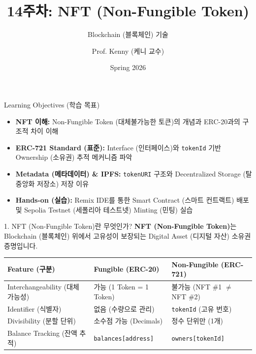 \documentclass[aspectratio=169]{beamer}
\title[14주차: NFT (ERC-721)]{14주차: NFT (Non-Fungible Token)}
\subtitle{Blockchain (블록체인) 기술}
\author[Prof. Kenny]{Prof. Kenny (케니 교수)}
\institute[KNU]{Kyungpook National University (경북대학교)}
\date{Spring 2026}
\begin{document}
\begin{frame}
    \titlepage
\end{frame}

\begin{frame}{Learning Objectives (학습 목표)}
    \begin{itemize}
        \item \textbf{NFT 이해:} Non-Fungible Token (대체불가능한 토큰)의 개념과 ERC-20과의 구조적 차이 이해
        \item \textbf{ERC-721 Standard (표준):} Interface (인터페이스)와 \texttt{tokenId} 기반 Ownership (소유권) 추적 메커니즘 파악
        \item \textbf{Metadata (메타데이터) \& IPFS:} \texttt{tokenURI} 구조와 Decentralized Storage (탈중앙화 저장소) 저장 이유
        \item \textbf{Hands-on (실습):} Remix IDE를 통한 Smart Contract (스마트 컨트랙트) 배포 및 Sepolia Testnet (세폴리아 테스트넷) Minting (민팅) 실습
    \end{itemize}
\end{frame}

\begin{frame}{1. NFT (Non-Fungible Token)란 무엇인가?}
    \textbf{NFT (Non-Fungible Token)}는 Blockchain (블록체인) 위에서 고유성이 보장되는 Digital Asset (디지털 자산) 소유권 증명입니다.

    \vspace{0.5cm}
    \begin{table}[]
        \centering
        \begin{tabular}{@{}lll@{}}
            \toprule
            \textbf{Feature (구분)} & \textbf{Fungible (ERC-20)} & \textbf{Non-Fungible (ERC-721)} \\ \midrule
            Interchangeability (대체 가능성) & 가능 (1 Token = 1 Token) & 불가능 (NFT \#1 $\neq$ NFT \#2) \\
            Identifier (식별자) & 없음 (수량으로 관리) & \texttt{tokenId} (고유 번호) \\
            Divisibility (분할 단위) & 소수점 가능 (Decimals) & 정수 단위만 (1개) \\
            Balance Tracking (잔액 추적) & \texttt{balances[address]} & \texttt{owners[tokenId]} \\ \bottomrule
        \end{tabular}
    \end{table}
\end{frame}
\end{document}
